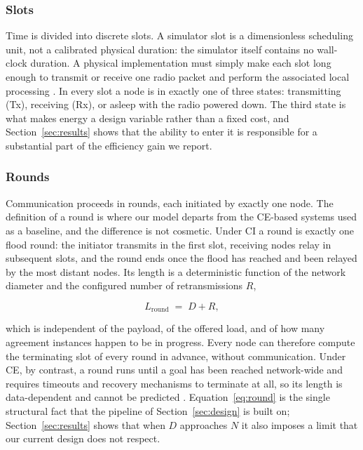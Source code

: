 \documentclass[journal]{IEEEtran}
\newcommand{\CI}{CI}                      %
\newcommand{\CE}{CE}                      %
\newcommand{\Nnodes}{N}                   %
\newcommand{\Diam}{D}                     %
\newcommand{\Nretx}{R}                    %
\newcommand{\Lround}{L_{\mathrm{round}}}  %
\begin{document}
\subsubsection{Slots}
Time is divided into discrete slots. A simulator slot is a dimensionless
scheduling unit, not a calibrated physical duration: the simulator itself
contains no wall-clock duration. A physical implementation must simply
make each slot long enough to transmit or receive one radio packet and
perform the associated local processing \cite{ferrari11glossy}. In every
slot a node is in exactly one of three states: transmitting (Tx), receiving
(Rx), or asleep with the radio powered down. The third state is what makes
energy a
design variable rather than a fixed cost, and
Section~\ref{sec:results} shows that the ability to enter it is
responsible for a substantial part of the efficiency gain we report.

\subsubsection{Rounds}
Communication proceeds in rounds, each initiated by exactly one node. The
definition of a round is where our model departs from the \CE-based
systems used as a baseline, and the difference is not cosmetic. Under
\CI{} a round is exactly one flood round: the initiator transmits in the
first slot, receiving nodes relay in subsequent slots, and the round ends
once the flood has reached and been relayed by the most distant nodes. Its
length is a deterministic function of the network diameter and the
configured number of retransmissions $\Nretx$,

\begin{equation}
\label{eq:round}
\Lround \;=\; \Diam + \Nretx ,
\end{equation}

which is independent of the payload, of the offered load, and of how many
agreement instances happen to be in progress. Every node can therefore
compute the terminating slot of every round in advance, without
communication. Under \CE, by contrast, a round runs until a goal has been
reached network-wide and requires timeouts and recovery mechanisms to
terminate at all, so its length is data-dependent and cannot be predicted
\cite{landsiedel13chaos}. Equation~\eqref{eq:round} is the single
structural fact that the pipeline of Section~\ref{sec:design} is built
on; Section~\ref{sec:results} shows that when $\Diam$ approaches
$\Nnodes$ it also imposes a limit that our current design does not
respect.
\end{document}
